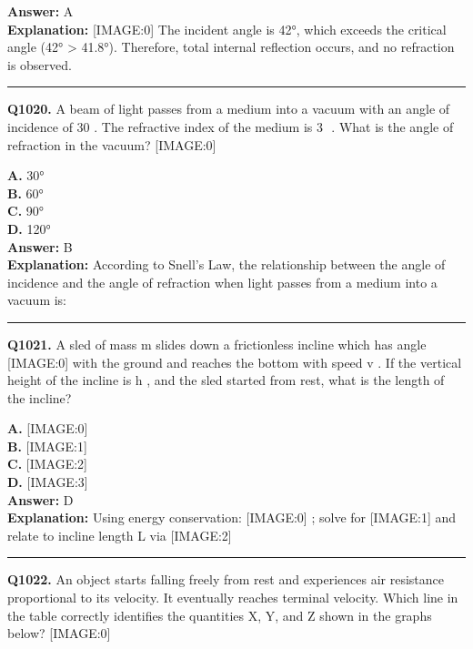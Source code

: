 \documentclass[12pt]{article}
\begin{document}
\textbf{Answer:} A \\
\textbf{Explanation:} [IMAGE:0]
The incident angle is 42°, which exceeds the critical angle (42° > 41.8°). Therefore, total internal reflection occurs, and no refraction is observed.

\hrule
\vspace{1em}


\noindent
\textbf{Q1020.} A beam of light passes from a medium into a vacuum with an angle of incidence of 30
\circ 
. The refractive index of the medium is 3
​
. What is the angle of refraction in the vacuum?
[IMAGE:0]



\textbf{A.} 30° \\
\textbf{B.} 60° \\
\textbf{C.} 90° \\
\textbf{D.} 120° \\

\textbf{Answer:} B \\
\textbf{Explanation:} According to Snell's Law, the relationship between the angle of incidence and the angle of refraction when light passes from a medium into a vacuum is:

\hrule
\vspace{1em}


\noindent
\textbf{Q1021.} A sled of mass
m
slides down a frictionless incline which has angle
[IMAGE:0]
with the ground and reaches the bottom with speed
v
. If the vertical height of the incline is
h
, and the sled started from rest, what is the length of the incline?



\textbf{A.} [IMAGE:0] \\
\textbf{B.} [IMAGE:1] \\
\textbf{C.} [IMAGE:2] \\
\textbf{D.} [IMAGE:3] \\

\textbf{Answer:} D \\
\textbf{Explanation:} Using energy conservation:
[IMAGE:0]
; solve for
[IMAGE:1]
and relate to incline length
L
via
[IMAGE:2]

\hrule
\vspace{1em}


\noindent
\textbf{Q1022.} An object starts falling freely from rest and experiences air resistance proportional to its velocity. It eventually reaches terminal velocity. Which line in the table correctly identifies the quantities X, Y, and Z shown in the graphs below?
[IMAGE:0]
\end{document}
